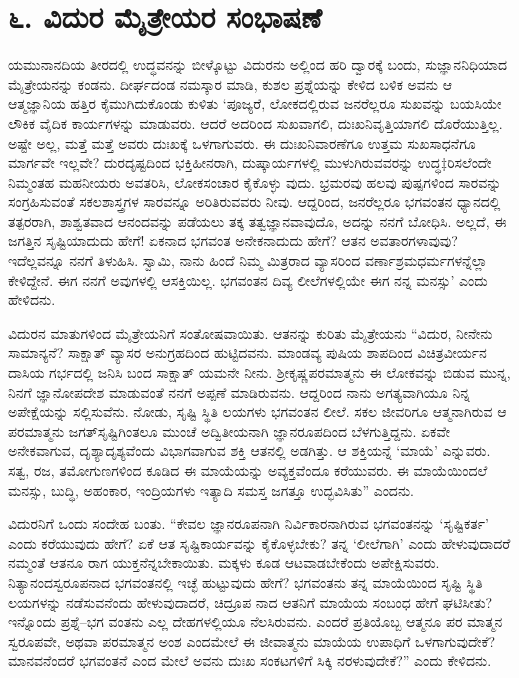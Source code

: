 
\chapter{೬. ವಿದುರ ಮೈತ್ರೇಯರ ಸಂಭಾಷಣೆ}

ಯಮುನಾನದಿಯ ತೀರದಲ್ಲಿ ಉದ್ಧವನನ್ನು ಬೀಳ್ಕೊಟ್ಟು ವಿದುರನು ಅಲ್ಲಿಂದ ಹರಿ ದ್ವಾರಕ್ಕೆ ಬಂದು, ಸುಜ್ಞಾನನಿಧಿಯಾದ ಮೈತ್ರೇಯನನ್ನು ಕಂಡನು. ದೀರ್ಘದಂಡ ನಮಸ್ಕಾರ ಮಾಡಿ, ಕುಶಲ ಪ್ರಶ್ನೆಯನ್ನು ಕೇಳಿದ ಬಳಿಕ ಅವನು ಆ ಆತ್ಮಜ್ಞಾನಿಯ ಹತ್ತಿರ ಕೈಮುಗಿದುಕೊಂಡು ಕುಳಿತು ‘ಪೂಜ್ಯರೆ, ಲೋಕದಲ್ಲಿರುವ ಜನರೆಲ್ಲರೂ ಸುಖವನ್ನು ಬಯಸಿಯೇ ಲೌಕಿಕ ವೈದಿಕ ಕಾರ್ಯಗಳನ್ನು ಮಾಡುವರು. ಆದರೆ ಅದರಿಂದ ಸುಖವಾಗಲಿ, ದುಃಖನಿವೃತ್ತಿಯಾಗಲಿ ದೊರೆಯುತ್ತಿಲ್ಲ. ಅಷ್ಟೇ ಅಲ್ಲ, ಮತ್ತೆ ಮತ್ತೆ ಅವರು ದುಃಖಕ್ಕೆ ಒಳಗಾಗುವರು. ಈ ದುಃಖನಿವಾರಣೆಗೂ ಉತ್ತಮ ಸುಖಸಾಧನೆಗೂ ಮಾರ್ಗವೇ ಇಲ್ಲವೇ? ದುರದೃಷ್ಟದಿಂದ ಭಕ್ತಿಹೀನರಾಗಿ, ದುಷ್ಕಾರ್ಯಗಳಲ್ಲಿ ಮುಳುಗಿರುವವರನ್ನು ಉದ್ಧ‡ರಿಸಲೆಂದೇ ನಿಮ್ಮಂತಹ ಮಹನೀಯರು ಅವತರಿಸಿ, ಲೋಕಸಂಚಾರ ಕೈಕೊಳ್ಳು ವುದು. ಭ್ರಮರವು ಹಲವು ಪುಷ್ಪಗಳಿಂದ ಸಾರವನ್ನು ಸಂಗ್ರಹಿಸುವಂತೆ ಸಕಲಶಾಸ್ತ್ರಗಳ ಸಾರವನ್ನೂ ಅರಿತಿರುವವರು ನೀವು. ಆದ್ದರಿಂದ, ಜನರೆಲ್ಲರೂ ಭಗವಂತನ ಧ್ಯಾನದಲ್ಲಿ ತತ್ಪರರಾಗಿ, ಶಾಶ್ವತವಾದ ಆನಂದವನ್ನು ಪಡೆಯಲು ತಕ್ಕ ತತ್ವಜ್ಞಾನವಾವುದೊ, ಅದನ್ನು ನನಗೆ ಬೋಧಿಸಿ. ಅಲ್ಲದೆ, ಈ ಜಗತ್ತಿನ ಸೃಷ್ಟಿಯಾದುದು ಹೇಗೆ! ಏಕನಾದ ಭಗವಂತ ಅನೇಕನಾದುದು ಹೇಗೆ? ಆತನ ಅವತಾರಗಳಾವುವು? ಇದೆಲ್ಲವನ್ನೂ ನನಗೆ ತಿಳುಹಿಸಿ. ಸ್ವಾಮಿ, ನಾನು ಹಿಂದೆ ನಿಮ್ಮ ಮಿತ್ರರಾದ ವ್ಯಾಸರಿಂದ ವರ್ಣಾಶ್ರಮಧರ್ಮಗಳನ್ನೆಲ್ಲಾ ಕೇಳಿದ್ದೇನೆ. ಈಗ ನನಗೆ ಅವುಗಳಲ್ಲಿ ಆಸಕ್ತಿಯಿಲ್ಲ. ಭಗವಂತನ ದಿವ್ಯ ಲೀಲೆಗಳಲ್ಲಿಯೇ ಈಗ ನನ್ನ ಮನಸ್ಸು’ ಎಂದು ಹೇಳಿದನು.

ವಿದುರನ ಮಾತುಗಳಿಂದ ಮೈತ್ರೇಯನಿಗೆ ಸಂತೋಷವಾಯಿತು. ಆತನನ್ನು ಕುರಿತು ಮೈತ್ರೇಯನು “ವಿದುರ, ನೀನೇನು ಸಾಮಾನ್ಯನೆ? ಸಾಕ್ಷಾತ್ ವ್ಯಾಸರ ಅನುಗ್ರಹದಿಂದ ಹುಟ್ಟಿದವನು. ಮಾಂಡವ್ಯ ಪುಷಿಯ ಶಾಪದಿಂದ ವಿಚಿತ್ರವೀರ್ಯನ ದಾಸಿಯ ಗರ್ಭದಲ್ಲಿ ಜನಿಸಿ ಬಂದ ಸಾಕ್ಷಾತ್ ಯಮನೇ ನೀನು. ಶ್ರೀಕೃಷ್ಣಪರಮಾತ್ಮನು ಈ ಲೋಕವನ್ನು ಬಿಡುವ ಮುನ್ನ, ನಿನಗೆ ಜ್ಞಾನೋಪದೇಶ ಮಾಡುವಂತೆ ನನಗೆ ಅಪ್ಪಣೆ ಮಾಡಿರುವನು. ಆದ್ದರಿಂದ ನಾನು ಅಗತ್ಯವಾಗಿಯೂ ನಿನ್ನ ಅಪೇಕ್ಷೆಯನ್ನು ಸಲ್ಲಿಸುವೆನು. ನೋಡು, ಸೃಷ್ಟಿ ಸ್ಥಿತಿ ಲಯಗಳು ಭಗವಂತನ ಲೀಲೆ. ಸಕಲ ಜೀವರಿಗೂ ಆತ್ಮನಾಗಿರುವ ಆ ಪರಮಾತ್ಮನು ಜಗತ್​ಸೃಷ್ಟಿಗಿಂತಲೂ ಮುಂಚೆ ಅದ್ವಿತೀಯನಾಗಿ ಜ್ಞಾನರೂಪದಿಂದ ಬೆಳಗುತ್ತಿದ್ದನು. ಏಕವೇ ಅನೇಕವಾಗುವ, ದೃಶ್ಯಾದೃಶ್ಯವೆಂದು ವಿಭಾಗವಾಗುವ ಶಕ್ತಿ ಆತನಲ್ಲಿ ಅಡಗಿತ್ತು. ಆ ಶಕ್ತಿಯನ್ನೆ ‘ಮಾಯೆ’ ಎನ್ನುವರು. ಸತ್ವ, ರಜ, ತಮೋಗುಣಗಳಿಂದ ಕೂಡಿದ ಈ ಮಾಯೆಯನ್ನು ಅವ್ಯಕ್ತವೆಂದೂ ಕರೆಯುವರು. ಈ ಮಾಯೆಯಿಂದಲೆ ಮನಸ್ಸು, ಬುದ್ಧಿ, ಅಹಂಕಾರ, ಇಂದ್ರಿಯಗಳು ಇತ್ಯಾದಿ ಸಮಸ್ತ ಜಗತ್ತೂ ಉದ್ಭವಿಸಿತು” ಎಂದನು.

ವಿದುರನಿಗೆ ಒಂದು ಸಂದೇಹ ಬಂತು. “ಕೇವಲ ಜ್ಞಾನರೂಪನಾಗಿ ನಿರ್ವಿಕಾರನಾಗಿರುವ ಭಗವಂತನನ್ನು ‘ಸೃಷ್ಟಿಕರ್ತ’ ಎಂದು ಕರೆಯುವುದು ಹೇಗೆ? ಏಕೆ ಆತ ಸೃಷ್ಟಿಕಾರ್ಯವನ್ನು ಕೈಕೊಳ್ಳಬೇಕು? ತನ್ನ ‘ಲೀಲೆಗಾಗಿ’ ಎಂದು ಹೇಳುವುದಾದರೆ ನಮ್ಮಂತೆ ಆತನೂ ರಾಗ ಯುಕ್ತನೆನ್ನಬೇಕಾಯಿತು. ಮಕ್ಕಳು ಕೂಡ ಆಟವಾಡಬೇಕೆಂದು ಅಪೇಕ್ಷಿಸುವರು. ನಿತ್ಯಾನಂದಸ್ವರೂಪನಾದ ಭಗವಂತನಲ್ಲಿ ಇಚ್ಛೆ ಹುಟ್ಟುವುದು ಹೇಗೆ? ಭಗವಂತನು ತನ್ನ ಮಾಯೆಯಿಂದ ಸೃಷ್ಟಿ ಸ್ಥಿತಿ ಲಯಗಳನ್ನು ನಡೆಸುವನೆಂದು ಹೇಳುವುದಾದರೆ, ಚಿದ್ರೂಪ ನಾದ ಆತನಿಗೆ ಮಾಯೆಯ ಸಂಬಂಧ ಹೇಗೆ ಘಟಿಸೀತು? ಇನ್ನೊಂದು ಪ್ರಶ್ನೆ–ಭಗ ವಂತನು ಎಲ್ಲ ದೇಹಗಳಲ್ಲಿಯೂ ನೆಲಸಿರುವನು. ಎಂದರೆ ಪ್ರತಿಯೊಬ್ಬ ಆತ್ಮನೂ ಪರ ಮಾತ್ಮನ ಸ್ವರೂಪವೇ, ಅಥವಾ ಪರಮಾತ್ಮನ ಅಂಶ ಎಂದಮೇಲೆ ಈ ಜೀವಾತ್ಮನು ಮಾಯೆಯ ಉಪಾಧಿಗೆ ಒಳಗಾಗುವುದೇಕೆ? ಮಾನವನೆಂದರೆ ಭಗವಂತನೆ ಎಂದ ಮೇಲೆ ಅವನು ದುಃಖ ಸಂಕಟಗಳಿಗೆ ಸಿಕ್ಕಿ ನರಳುವುದೇಕೆ?” ಎಂದು ಕೇಳಿದನು.

